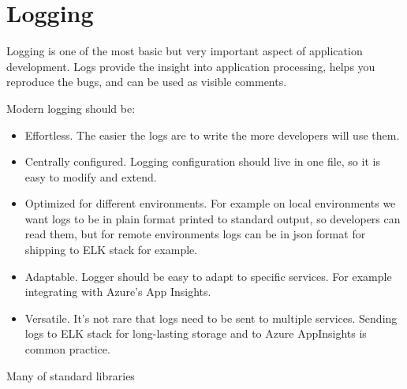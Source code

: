    \section{Logging}\label{sec:logging}

    Logging is one of the most basic but very important aspect of application development.
    Logs provide the insight into application processing, helps you reproduce the bugs,
    and can be used as visible comments.

    Modern logging should be:
    \begin{itemize}
        \item Effortless.
        The easier the logs are to write the more developers will use them.
        \item Centrally configured.
        Logging configuration should live in one file, so it is easy to modify and extend.
        \item Optimized for different environments.
        For example on local environments we want
        logs to be in plain format printed to standard output, so developers can read them,
        but for remote environments logs can be in json format for shipping to ELK stack for example.
        \item Adaptable.
        Logger should be easy to adapt to specific services.
        For example
        integrating with Azure's App Insights.
        \item Versatile.
        It's not rare that logs need to be sent to multiple services.
        Sending
        logs to ELK stack for long-lasting storage and to Azure AppInsights is common practice.
    \end{itemize}

    Many of standard libraries